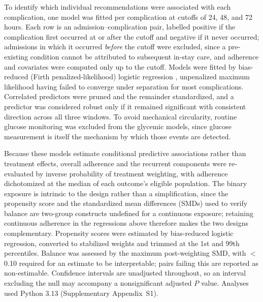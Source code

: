 To identify which individual recommendations were associated with each
complication, one model was fitted per complication at cutoffs of 24, 48, and
72 hours. Each row is an admission--complication pair, labelled positive if the
complication first occurred at or after the cutoff and negative if it never
occurred; admissions in which it occurred \emph{before} the cutoff were
excluded, since a pre-existing condition cannot be attributed to subsequent
in-stay care, and adherence and covariates were computed only up to the cutoff.
Models were fitted by bias-reduced (Firth penalized-likelihood) logistic
regression \citep{firth1993bias}, unpenalized maximum likelihood having failed
to converge under separation for most complications. Correlated predictors were
pruned and the remainder standardized, and a predictor was considered robust
only if it remained significant with consistent direction across all three
windows. To avoid mechanical circularity, routine glucose monitoring was
excluded from the glycemic models, since glucose measurement is itself the
mechanism by which those events are detected.

Because these models estimate conditional predictive associations rather than
treatment effects, overall adherence and the recurrent components were
re-evaluated by inverse probability of treatment weighting, with adherence
dichotomized at the median of each outcome's eligible population. The binary
exposure is intrinsic to the design rather than a simplification, since the
propensity score \citep{rosenbaum1983central} and the standardized mean
differences (SMDs) used to verify balance \citep{austin2009balance} are
two-group constructs undefined for a continuous exposure; retaining continuous
adherence in the regressions above therefore makes the two designs
complementary. Propensity scores were estimated by bias-reduced logistic
regression, converted to stabilized weights and trimmed at the 1st and 99th
percentiles. Balance was assessed by the maximum post-weighting SMD, with
$<$0.10 required for an estimate to be interpretable; pairs failing this are
reported as non-estimable. Confidence intervals are unadjusted throughout, so an
interval excluding the null may accompany a nonsignificant adjusted $P$ value.
Analyses used Python 3.13 (Supplementary Appendix~S1).
